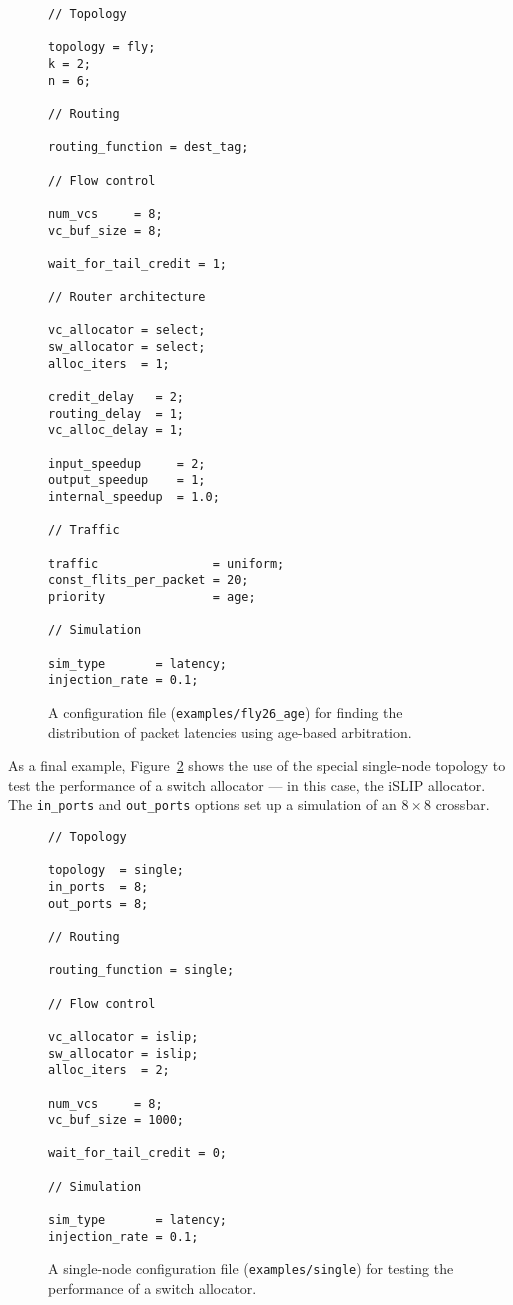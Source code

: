 \documentclass[11pt]{article}
\begin{document}
\begin{figure}
\begin{verbatim}
// Topology

topology = fly;
k = 2;
n = 6;

// Routing

routing_function = dest_tag;

// Flow control

num_vcs     = 8;
vc_buf_size = 8;

wait_for_tail_credit = 1;

// Router architecture

vc_allocator = select;
sw_allocator = select;
alloc_iters  = 1;

credit_delay   = 2;
routing_delay  = 1;
vc_alloc_delay = 1;

input_speedup     = 2;
output_speedup    = 1;
internal_speedup  = 1.0;

// Traffic

traffic                = uniform;
const_flits_per_packet = 20;
priority               = age;

// Simulation

sim_type       = latency;
injection_rate = 0.1;
\end{verbatim}
\caption{A configuration file (\texttt{examples/fly26\_age}) for
finding the distribution of packet latencies using age-based
arbitration.}
\label{fig:fly_dist}
\end{figure}

As a final example, Figure~\ref{fig:single} shows the use of the
special single-node topology to test the performance of a switch
allocator --- in this case, the iSLIP allocator.  The
\texttt{in\_ports} and \texttt{out\_ports} options set up a simulation
of an $8\times 8$ crossbar.

\begin{figure}
\begin{verbatim}
// Topology

topology  = single;
in_ports  = 8;
out_ports = 8;

// Routing

routing_function = single;

// Flow control

vc_allocator = islip;
sw_allocator = islip;
alloc_iters  = 2;

num_vcs     = 8;
vc_buf_size = 1000;

wait_for_tail_credit = 0;

// Simulation

sim_type       = latency;
injection_rate = 0.1;
\end{verbatim}
\caption{A single-node configuration file (\texttt{examples/single})
for testing the performance of a switch allocator.}
\label{fig:single}
\end{figure}
\end{document}
